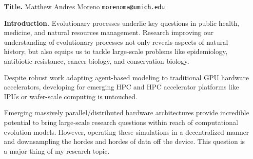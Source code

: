 


\textbf{Title.}
Matthew Andres Moreno \texttt{morenoma@umich.edu}

\textbf{Introduction.}
Evolutionary processes underlie key questions in public health, medicine, and natural resources management. Research improving our understanding of evolutionary processes not only reveals aspects of natural history, but also equips us to tackle large-scale problems like epidemiology, antibiotic resistance, cancer biology, and conservation biology.

Despite robust work adapting agent-based modeling to traditional GPU hardware accelerators, developing for emerging HPC and HPC accelerator platforms like IPUs or wafer-scale computing is untouched.

Emerging massively parallel/distributed hardware architectures provide incredible potential to bring large-scale research questions within reach of computational evolution models. However, operating these simulations in a decentralized manner and downsampling the hordes and hordes of data off the device. This question is a major thing of my research topic.

